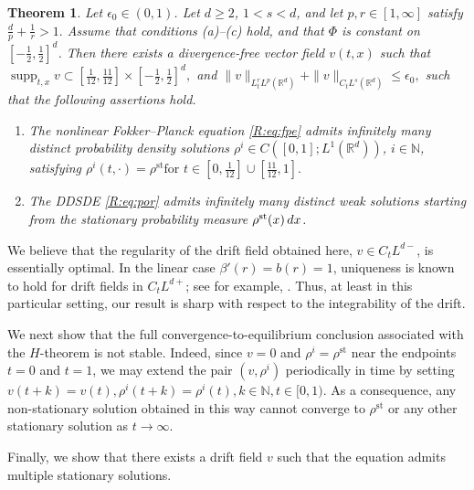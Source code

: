 \documentclass[10pt,a4paper]{amsart}
\numberwithin{equation}{section}
\newtheorem{theorem}{Theorem}[section]
\def\dif{{\mathord{{\rm d}}}}
\def\geq{\geqslant}
\def\leq{\leqslant}
\def\dif{{\mathord{{\rm d}}}}
\def\bt{\begin{theorem}}
\def\et{\end{theorem}}
\def\geq{\geqslant}
\def\leq{\leqslant}
\begin{document}
\bt\label{R:thm:4converge}
Let $\epsilon_0\in(0,1)$. Let $d\geq 2$, $1<s<d$, and let
$p,r\in[1,\infty]$ satisfy
$
\frac{d}{p}+\frac{1}{r}>1 .
$
Assume that conditions \textnormal{(a)}--\textnormal{(c)} hold, and that
$\Phi$ is constant on $[-\frac12,\frac12]^d$. Then there exists a
divergence-free vector field $v(t,x)$ such that
$
\operatorname{supp}_{t,x}v
\subset
 [\frac1{12},\frac{11}{12} ]
\times
 [-\frac12,\frac12 ]^d,
$
and $\|v\|_{L^r_tL^p(\mathbb{R}^d)}
+
\|v\|_{C_tL^s(\mathbb{R}^d)}
\leq
\epsilon_0 ,$ 
such that the following assertions hold.

\begin{enumerate}
    \item
    The nonlinear Fokker--Planck equation \eqref{R:eq:fpe} admits infinitely
    many distinct probability density solutions
    $\rho^i\in C([0,1];L^1(\mathbb{R}^d))$, $i\in\mathbb{N}$, satisfying
 $
    \rho^i(t,\cdot)=\rho^{\mathrm{st}}
    \text{for }
    t\in
     [0,\frac1{12} ]
    \cup
     [\frac{11}{12},1].
   $

    \item
    The DDSDE \eqref{R:eq:por} admits infinitely many distinct weak
    solutions starting from the stationary probability measure
    $\rho^{\mathrm{st}}(x)\,\dif x$.
\end{enumerate}
\et

We believe that the regularity of the drift field obtained here,
$v\in C_tL^{d-}$, is essentially optimal. In the linear case
$\beta'(r)=b(r)=1$, uniqueness is known to hold for drift fields in
$C_tL^{d+}$; see for example, \cite{KR05,Zha11,RZ21}. Thus, at least in this particular setting, our
result is sharp with respect to the integrability of the drift. 

We next show that the full convergence-to-equilibrium conclusion associated
with the $H$-theorem is not stable. 
Indeed, since
$
  v=0 
$
and $\rho^i=\rho^{\mathrm{st}}$ near the endpoints $t=0$ and $t=1$, we
may extend the pair $(v,\rho^i)$ periodically in time by setting
$
v(t+k)=v(t),
\rho^i(t+k)=\rho^i(t),
k\in\mathbb{N},
t\in[0,1).
$
As a consequence, any non-stationary solution obtained in this way cannot
converge to $\rho^{\mathrm{st}}$ or any other stationary solution as $t\to\infty$.

Finally, we show that there exists a drift field $v$ such
that the  equation admits multiple stationary solutions.
\end{document}
